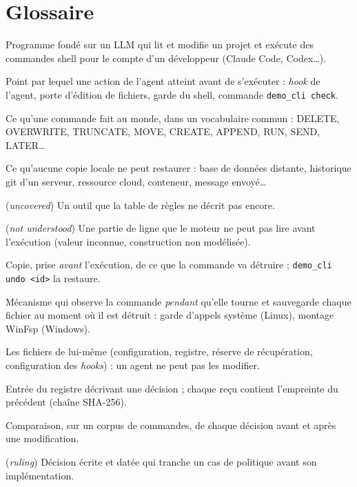 \section*{Glossaire}
\begin{description}[style=nextline,leftmargin=0.6cm,font=\sffamily\bfseries]
  \item[Agent de code IA] Programme fondé sur un LLM qui lit et modifie un projet et exécute
    des commandes shell pour le compte d'un développeur (Claude Code, Codex\ldots).
  \item[Porte] Point par lequel une action de l'agent atteint \demo{} avant de s'exécuter :
    \textit{hook} de l'agent, porte d'édition de fichiers, garde du shell, commande
    \texttt{demo\_cli check}.
  \item[Effet] Ce qu'une commande fait au monde, dans un vocabulaire commun : DELETE,
    OVERWRITE, TRUNCATE, MOVE, CREATE, APPEND, RUN, SEND, LATER\ldots
  \item[Surface distante] Ce qu'aucune copie locale ne peut restaurer : base de données
    distante, historique git d'un serveur, ressource cloud, conteneur, message envoyé\ldots
  \item[Non couvert] (\textit{uncovered}) Un outil que la table de règles ne décrit pas encore.
  \item[Non compris] (\textit{not understood}) Une partie de ligne que le moteur ne peut pas lire
    avant l'exécution (valeur inconnue, construction non modélisée).
  \item[Point de récupération] Copie, prise \emph{avant} l'exécution, de ce que la commande
    va détruire ; \texttt{demo\_cli undo <id>} la restaure.
  \item[Filet d'exécution] Mécanisme qui observe la commande \emph{pendant} qu'elle tourne et
    sauvegarde chaque fichier au moment où il est détruit : garde d'appels système (Linux),
    montage WinFsp (Windows).
  \item[Plan de contrôle] Les fichiers de \demo{} lui-même (configuration, registre, réserve
    de récupération, configuration des \textit{hooks}) : un agent ne peut pas les modifier.
  \item[Reçu] Entrée du registre décrivant une décision ; chaque reçu contient l'empreinte du
    précédent (chaîne SHA-256).
  \item[Portail de décision] Comparaison, sur un corpus de \nbcorpus{} commandes, de chaque
    décision avant et après une modification.
  \item[Arbitrage] (\textit{ruling}) Décision écrite et datée qui tranche un cas de politique
    avant son implémentation.
\end{description}
